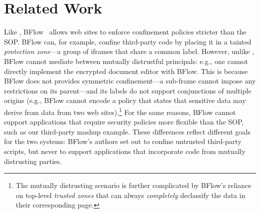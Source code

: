 \section{Related Work}
\label{sec:related}

%
Like \sys{}, BFlow~\cite{Yip:2009:PBS} allows web sites to enforce confinement policies
stricter than the SOP\@.
%
BFlow can, for example, confine third-party code by placing
it in a tainted \emph{protection zone}---a group
of iframes that share a common label.
%
However, unlike \sys{}, BFlow cannot mediate between mutually
distrustful principals: e.g., one cannot directly implement the
encrypted document editor with BFlow.
%
This is because BFlow does not provides symmetric confinement---a
sub-frame cannot impose any restrictions on its parent---and its
labels do not support conjunctions of multiple origins (e.g., BFlow
cannot encode a policy that states that sensitive data may derive from
data from two web sites).\footnote{ The mutually distrusting scenario
  is further complicated by BFlow's reliance on top-level
  \emph{trusted zones} that can always \emph{completely} declassify
  the data in their corresponding page.}
%
For the same reasons, BFlow cannot support applications that require
security policies more flexible than the SOP, such as our third-party
mashup example.
%
These differences reflect different goals for the two systems: BFlow's
authors set out to confine untrusted third-party scripts, but never to
support applications that incorporate code from mutually distrusting
parties.
%
%



